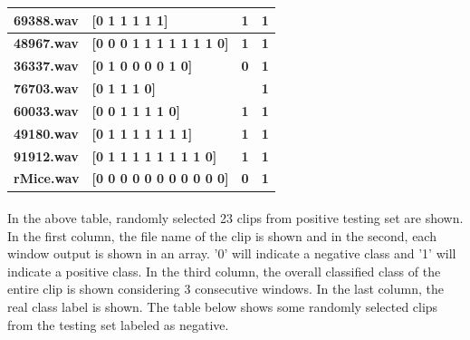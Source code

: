 \documentclass[12pt]{article}
\numberwithin{figure}{section}
\numberwithin{table}{section}
\begin{document}
\begin{table}[H]
\begin{tabular}{|m{}|m{}|m{}|m{}|}
\bf {69388.wav} &  {\bf{[0 1 1 1 1 1]}} &  {\bf{1}} &  {\bf{1}} \\ \hline
\bf {48967.wav} &  {\bf{[0 0 0 1 1 1 1 1 1 1 0]}} &  {\bf{1}} &  {\bf{1}} \\ \hline
\bf {36337.wav} &  {\bf{[0 1 0 0 0 0 1 0]}} &  {\bf{0}} &  {\bf{1}} \\ \hline
\bf {76703.wav} &  {\bf{[0 1 1 1 0]}} &  {\bf{}} &  {\bf{1}} \\ \hline
\bf {60033.wav} &  {\bf{[0 0 1 1 1 1 0]}} &  {\bf{1}} &  {\bf{1}} \\ \hline
\bf {49180.wav} &  {\bf{[0 1 1 1 1 1 1 1]}} &  {\bf{1}} &  {\bf{1}} \\ \hline
\bf {91912.wav} &  {\bf{[0 1 1 1 1 1 1 1 1 0]}} &  {\bf{1}} &  {\bf{1}} \\ \hline
\bf {rMice.wav} &  {\bf{[0 0 0 0 0 0 0 0 0 0 0]}} &  {\bf{0}} &  {\bf{1}} \\ \hline
\end{tabular}
\end{table}

\newpage
\paragraph{}
In the above table, randomly selected 23 clips from positive testing set are shown. In the first column, the file name of the clip is shown and in the second, each window output is shown in an array. '0' will indicate a negative class and '1' will indicate a positive class. In the third column, the overall classified class of the entire clip is shown considering 3 consecutive windows. In the last column, the real class label is shown. The table below shows some randomly selected clips from the testing set labeled as negative.
\end{document}
